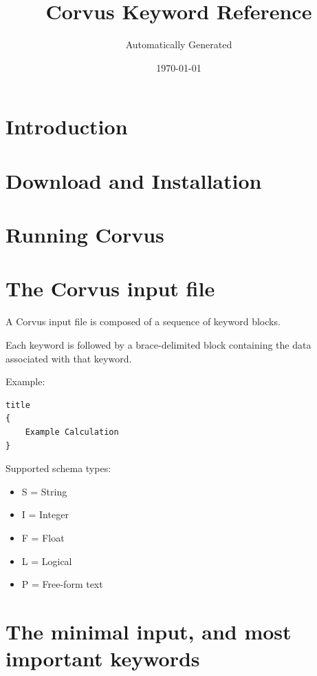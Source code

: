\documentclass[11pt]{article}
\title{Corvus Keyword Reference}
\author{Automatically Generated}
\date{\today}
\begin{document}
\maketitle



\tableofcontents

\newpage

\section{Introduction}


\section{Download and Installation}


\section{Running Corvus}


\section{The Corvus input file}

A Corvus input file is composed of a sequence of
keyword blocks.

Each keyword is followed by a brace-delimited
block containing the data associated with that
keyword.

Example:

\begin{Verbatim}
title
{
    Example Calculation
}
\end{Verbatim}

Supported schema types:

\begin{itemize}

\item S = String

\item I = Integer

\item F = Float

\item L = Logical

\item P = Free-form text

\end{itemize}

\section{The minimal input, and most important keywords}

\end{document}
